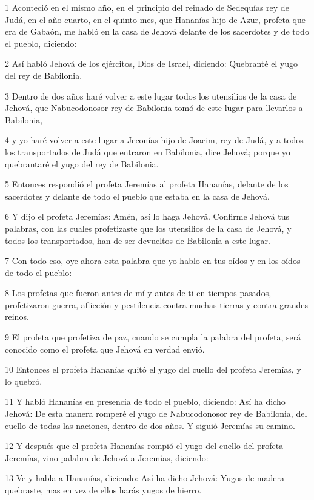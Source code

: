 \par 1 Aconteció en el mismo año, en el principio del reinado de Sedequías rey de Judá, en el año cuarto, en el quinto mes, que Hananías hijo de Azur, profeta que era de Gabaón, me habló en la casa de Jehová delante de los sacerdotes y de todo el pueblo, diciendo:
\par 2 Así habló Jehová de los ejércitos, Dios de Israel, diciendo: Quebranté el yugo del rey de Babilonia.
\par 3 Dentro de dos años haré volver a este lugar todos los utensilios de la casa de Jehová, que Nabucodonosor rey de Babilonia tomó de este lugar para llevarlos a Babilonia,
\par 4 y yo haré volver a este lugar a Jeconías hijo de Joacim, rey de Judá, y a todos los transportados de Judá que entraron en Babilonia, dice Jehová; porque yo quebrantaré el yugo del rey de Babilonia.
\par 5 Entonces respondió el profeta Jeremías al profeta Hananías, delante de los sacerdotes y delante de todo el pueblo que estaba en la casa de Jehová.
\par 6 Y dijo el profeta Jeremías: Amén, así lo haga Jehová. Confirme Jehová tus palabras, con las cuales profetizaste que los utensilios de la casa de Jehová, y todos los transportados, han de ser devueltos de Babilonia a este lugar.
\par 7 Con todo eso, oye ahora esta palabra que yo hablo en tus oídos y en los oídos de todo el pueblo: 
\par 8 Los profetas que fueron antes de mí y antes de ti en tiempos pasados, profetizaron guerra, aflicción y pestilencia contra muchas tierras y contra grandes reinos.
\par 9 El profeta que profetiza de paz, cuando se cumpla la palabra del profeta, será conocido como el profeta que Jehová en verdad envió.
\par 10 Entonces el profeta Hananías quitó el yugo del cuello del profeta Jeremías, y lo quebró.
\par 11 Y habló Hananías en presencia de todo el pueblo, diciendo: Así ha dicho Jehová: De esta manera romperé el yugo de Nabucodonosor rey de Babilonia, del cuello de todas las naciones, dentro de dos años. Y siguió Jeremías su camino.
\par 12 Y después que el profeta Hananías rompió el yugo del cuello del profeta Jeremías, vino palabra de Jehová a Jeremías, diciendo:
\par 13 Ve y habla a Hananías, diciendo: Así ha dicho Jehová: Yugos de madera quebraste, mas en vez de ellos harás yugos de hierro.

